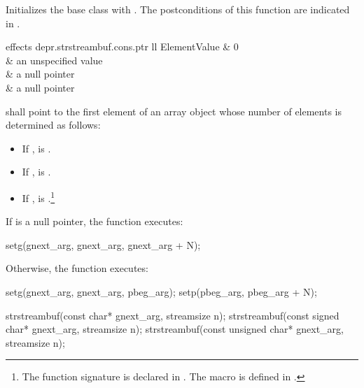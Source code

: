 \begin{itemdescr}
\pnum
\effects
Initializes the base class with .
The postconditions of this function are indicated in .

\begin{libtab2}{ effects}
{depr.strstreambuf.cons.ptr}
{ll}
{Element}{Value}
	&	0						\\
	&	an unspecified value	\\
	&	a null pointer			\\
	&	a null pointer			\\
\end{libtab2}

\pnum
{} shall point to the first element of an array
object whose number of elements  is determined as follows:
\begin{itemize}
\item
If
,
 is .
\item
If
,
 is
.
%
\item
If
,
 is
.\footnote{The function signature
%
is declared in .
The macro  is defined in .}
\end{itemize}

\pnum
If  is a null pointer, the function executes:

\begin{codeblock}
setg(gnext_arg, gnext_arg, gnext_arg + N);
\end{codeblock}

\pnum
Otherwise, the function executes:

\begin{codeblock}
setg(gnext_arg, gnext_arg, pbeg_arg);
setp(pbeg_arg,  pbeg_arg + N);
\end{codeblock}
\end{itemdescr}


%
\begin{itemdecl}
strstreambuf(const char* gnext_arg, streamsize n);
strstreambuf(const signed char* gnext_arg, streamsize n);
strstreambuf(const unsigned char* gnext_arg, streamsize n);
\end{itemdecl}

